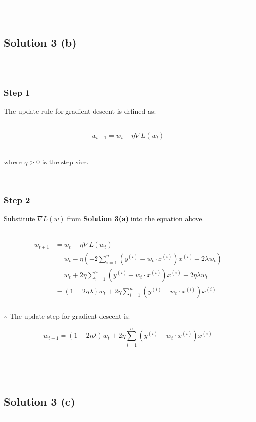 \documentclass{article}
\begin{document}
\noindent\rule{\textwidth}{0.4pt}\\

\newpage

\subsection*{Solution 3 (b)}
\noindent\rule{\textwidth}{0.4pt}\\

\subsubsection*{Step 1}
\parbox{\textwidth}{
The update rule for gradient descent is defined as:
}\\

$$w_{t+1} = w_t - \eta \nabla L(w_t)$$\\

\parbox{\textwidth}{
where $\eta > 0$ is the step size.
}\\

\subsubsection*{Step 2}
\parbox{\textwidth}{
Substitute $\nabla L(w)$ from \textbf{Solution 3(a)} into the equation above.
}\\
\begin{align*}
w_{t+1} &= w_t - \eta \nabla L(w_t) \\
&= w_t - \eta \left(-2\sum_{i=1}^{n}(y^{(i)}-w_t\cdot x^{(i)})x^{(i)} + 2\lambda w_t\right) \\
&= w_t + 2\eta\sum_{i=1}^{n}(y^{(i)}-w_t\cdot x^{(i)})x^{(i)} - 2\eta\lambda w_t \\
&= (1-2\eta\lambda)w_t + 2\eta\sum_{i=1}^{n}(y^{(i)}-w_t\cdot x^{(i)})x^{(i)}
\end{align*}

\subsubsection*{\normalfont}{$\therefore$ The update step for gradient descent is:}

$$w_{t+1} = (1-2\eta\lambda)w_t + 2\eta\sum_{i=1}^{n}(y^{(i)}-w_t\cdot x^{(i)})x^{(i)}$$\\

\noindent\rule{\textwidth}{0.4pt}\\

\newpage

\subsection*{Solution 3 (c)}
\noindent\rule{\textwidth}{0.4pt}\\
\end{document}

